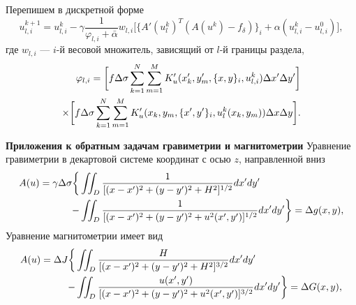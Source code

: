 \documentclass[10pt,pdf, mathserif, hyperref={unicode}]{beamer}
\begin{document}
\begin{frame}
	Перепишем в дискретной форме
	\begin{equation}\label{comp_lm_meth_disc}
	u_{l,i}^{k+1}=u_{l,i}^k-\gamma\frac{1}{\varphi_{l,i}+\bar{\alpha}}w_{l,i}\bigg[ \{A'(u_l^k)^T(A(u^k)-f_\delta)\}_i+\alpha (u_{l,i}^k-u_{l,i}^0)\bigg],
	\end{equation}
	где $w_{l,i}$ --- $i$-й весовой множитель, зависящий от $l$-й границы раздела,
	\begin{equation*}
	\begin{aligned}
	\varphi_{l,i}=\bigg[ f\Delta\sigma\sum\limits_{k=1}^{N}
	\sum\limits_{m=1}^{M}
	K'_u(x'_k,y'_m, \{x, y\}_i, u_{l,i}^k) \Delta x' \Delta y'\bigg] \notag \\ \times\bigg[f\Delta\sigma\sum\limits_{k=1}^{N}
	\sum\limits_{m=1}^{M}K'_u(x_k,y_m, \{x',y'\}_i,u_l^k(x_k,y_m))\Delta x \Delta y\bigg]. 
	\end{aligned}
	\end{equation*}
\end{frame}
\begin{frame}{\small\textbf{Приложения к обратным задачам гравиметрии и магнитометрии}}
	Уравнение гравиметрии в декартовой системе координат с осью $z$, направленной вниз 
	\begin{equation*}
	\begin{aligned}
	A(u)=\gamma\Delta\sigma \bigg\{ &\iint_{D} \frac{1}{[(x-x')^2+(y-y')^2+H^2]^{1/2}}dx'dy' \notag\\
	- &\iint_{D} \frac{1}{[(x-x')^2+(y-y')^2+u^2(x',y')]^{1/2}}dx'dy'\bigg\}=\Delta g(x,y),
	\end{aligned} 
	\end{equation*}
	Уравнение магнитометрии имеет вид
	\begin{equation*}\begin{aligned}
	A(u)=\Delta J  \bigg\{&\iint_{D} \frac{H}{[(x-x')^2+(y-y')^2+H^2]^{3/2}}dx'dy' \notag\\
	- &\iint_{D} \frac{u(x',y')}{[(x-x')^2+(y-y')^2+u^2(x',y')]^{3/2}}dx'dy' \bigg\}=\Delta G(x,y),
	\end{aligned} \end{equation*}
\end{frame}
\end{document}

